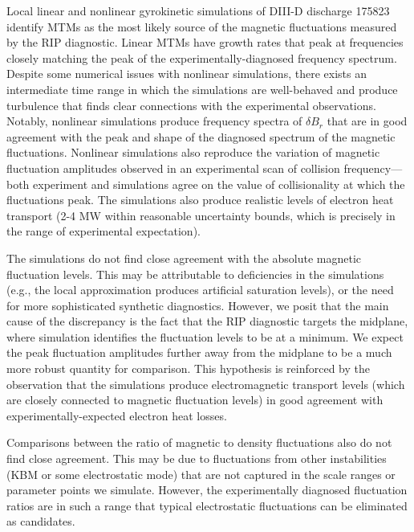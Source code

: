 \documentclass[
 aip,
 amsmath,amssymb,
 reprint
]{revtex4-1}
\begin{document}
Local linear and nonlinear gyrokinetic simulations of DIII-D discharge 175823 identify MTMs as the most likely source of the magnetic fluctuations measured by the RIP diagnostic.  Linear MTMs have growth rates that peak at frequencies closely matching the peak of the experimentally-diagnosed frequency spectrum.  Despite some numerical issues with nonlinear simulations, there exists an intermediate time range in which the simulations are well-behaved and produce turbulence that finds clear connections with the experimental observations.  Notably, nonlinear simulations produce frequency spectra of $\delta B_r$ that are in good agreement with the peak and shape of the diagnosed spectrum of the magnetic fluctuations.  Nonlinear simulations also reproduce the variation of magnetic fluctuation amplitudes observed in an experimental scan of collision frequency---both experiment and simulations agree on the value of collisionality at which the fluctuations peak.  The simulations also produce realistic levels of electron heat transport (2-4 MW within reasonable uncertainty bounds, which is precisely in the range of experimental expectation).  

The simulations do not find close agreement with the absolute magnetic fluctuation levels.  This may be attributable to deficiencies in the simulations (e.g., the local approximation produces artificial saturation levels), or the need for more sophisticated synthetic diagnostics.  However, we posit that the main cause of the discrepancy is the fact that the RIP diagnostic targets the midplane, where simulation identifies the fluctuation levels to be at a minimum.  We expect the peak fluctuation amplitudes further away from the midplane to be a much more robust quantity for comparison.  This hypothesis is reinforced by the observation that the simulations produce electromagnetic transport levels (which are closely connected to magnetic fluctuation levels) in good agreement with experimentally-expected electron heat losses.  

Comparisons between the ratio of magnetic to density fluctuations also do not find close agreement.  This may be due to fluctuations from other instabilities (KBM or some electrostatic mode) that are not captured in the scale ranges or parameter points we simulate.  However, the experimentally diagnosed fluctuation ratios are in such a range that typical electrostatic fluctuations can be eliminated as candidates.  
\end{document}

